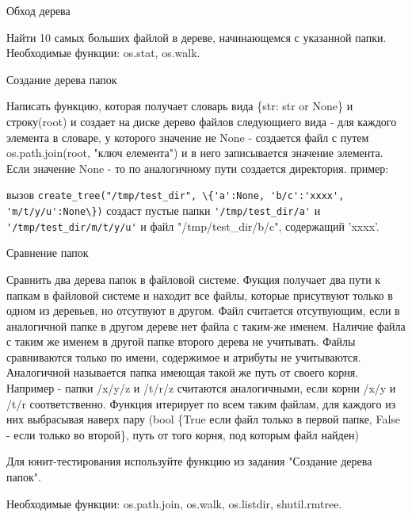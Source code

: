 \documentclass{article}
\begin{document}
\begin{center} Обход дерева \end{center}
Найти 10 самых больших файлой в дереве, начинающемся с указанной папки.
Необходимые функции: os.stat, os.walk.
\newpage

\begin{center} Создание дерева папок \end{center}
Написать функцию, которая получает словарь вида 
\{str: str or None\} и строку(root) и создает на диске дерево файлов следующиего вида - 
для каждого элемента в словаре, у которого значение не None - создается файл 
с путем os.path.join(root, "ключ елемента") и в него записывается значение элемента.
Если значение None - то по аналогичному пути создается директория.
пример:

вызов \lstinline!create_tree("/tmp/test_dir", \{'a':None, 'b/c':'xxxx', 'm/t/y/u':None\})!
создаст пустые папки \lstinline!'/tmp/test_dir/a'! и \lstinline!'/tmp/test_dir/m/t/y/u'!
и файл "/tmp/test\_dir/b/c", содержащий 'xxxx'.

\newpage

\begin{center} Сравнение папок \end{center}
Сравнить два дерева папок в файловой системе. Фукция получает два пути к 
папкам в файловой системе и находит все файлы, которые присутвуют только в 
одном из деревьев, но отсутвуют в другом. Файл считается отсутвующим, если 
в аналогичной папке в другом дереве нет файла с таким-же именем. Наличие файла 
с таким же именем в другой папке второго дерева не учитывать. Файлы сравниваются
только по имени, содержимое и атрибуты не учитываются. Аналогичной называется 
папка имеющая такой же путь от своего корня. Например - папки
/x/y/z и /t/r/z считаются аналогичными, если корни /x/y и /t/r соответственно.
Функция итерирует по всем таким файлам, для каждого из них выбрасывая наверх
пару (bool \{True если файл только в первой папке, False - если только во второй\},
 путь от того корня, под которым файл найден)

Для юнит-тестирования используйте функцию из задания "Создание дерева папок".

Необходимые функции: os.path.join, os.walk, os.listdir, shutil.rmtree.
\newpage
\end{document}
